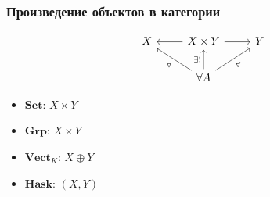 \documentclass{beamer}
\begin{document}
\begin{frame}[fragile]
\frametitle{Произведение объектов в категории}
\begin{equation}
\begin{tikzcd}
X & \arrow{l} X\times Y \arrow{r} & Y \\
& \forall A \arrow{ul}{\forall} \arrow{ur}[swap]{\forall} \arrow{u}{\exists!}
\end{tikzcd}
\end{equation}
\begin{itemize}
\pause
\item \begin{math}\mathbf{Set}\end{math}: \begin{math}X \times Y\end{math}
\pause
\item \begin{math}\mathbf{Grp}\end{math}: \begin{math}X \times Y\end{math}
\pause
\item \begin{math}\mathbf{Vect}_K\end{math}: \begin{math}X \oplus Y\end{math}
\pause
\item \begin{math}\mathbf{Hask}\end{math}: \begin{math}(X, Y)\end{math}
\end{itemize}
\end{frame}
\end{document}
